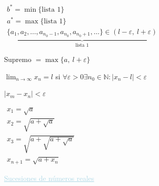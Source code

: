 \documentclass[12pt]{article}
\begin{document}
\pagebreak[4]

$\underbrace{\begin{array}{l}
		b^*=\min\{\text{lista 1}\}\\
		a^*=\max\{\text{lista 1}\}\\
		\{a_1,a_2,\hdots,a_{n_0-1},a_{n_0},a_{n_0+1},\hdots\}\in(l-\varepsilon, ~l+\varepsilon)
\end{array}}_{\text{lista 1}}$


Supremo $=\max\{a,~l+\varepsilon\}$

$\lim_{n\to\infty}x_n=l$ si $\forall\varepsilon>0\exists n_0\in\mathbb{N}:|x_n-l|<\varepsilon$

$|x_m-x_n|<\varepsilon$ 

$\begin{array}{l}
	x_1=\sqrt{a}\\
	x_2=\sqrt{a+\sqrt{a}}\\
	x_3=\sqrt{a+\sqrt{a+\sqrt{a}}}\\
	x_{n+1}=\sqrt{a+x_n}
\end{array}$

\textcolor{lightblue}{\underline{Sucesiones de números reales}}
\end{document}

